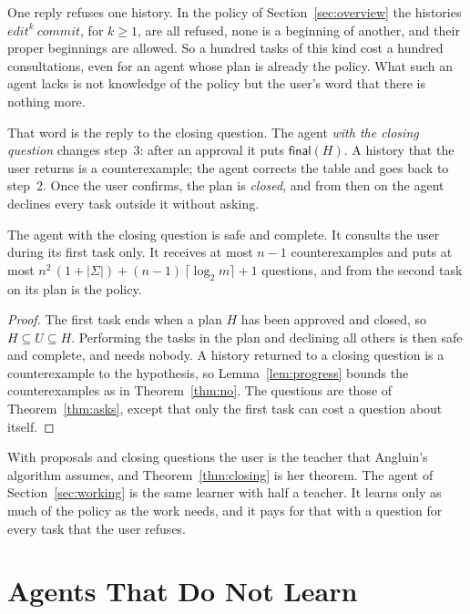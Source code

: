 \documentclass[acmsmall,nonacm,screen]{acmart}
\newcommand{\kw}[1]{\mathsf{#1}}
\newcommand{\nm}[1]{\mathit{#1}}
\newcommand{\final}[1]{\kw{final}(#1)}
\newcommand{\edit}{\nm{edit}}
\newcommand{\commit}{\nm{commit}}
\begin{document}
One reply refuses one history. In the policy of Section~\ref{sec:overview} the histories
$\edit^k\ \commit$, for $k \ge 1$, are all refused, none is a beginning of another, and
their proper beginnings are allowed. So a hundred tasks of this kind cost a hundred
consultations, even for an agent whose plan is already the policy. What such an agent
lacks is not knowledge of the policy but the user's word that there is nothing more.

That word is the reply to the closing question. The agent \emph{with the closing question}
changes step~3: after an approval it puts $\final{H}$. A history that the user returns is a
counterexample; the agent corrects the table and goes back to step~2. Once the user
confirms, the plan is \emph{closed}, and from then on the agent declines every task outside
it without asking.

\begin{theorem}
\label{thm:closing}
The agent with the closing question is safe and complete. It consults the user during its
first task only. It receives at most $n - 1$ counterexamples and puts at most
$n^2\,(1 + |\Sigma|) + (n - 1)\,\lceil \log_2 m \rceil + 1$ questions, and from the second
task on its plan is the policy.
\end{theorem}

\begin{proof}
The first task ends when a plan $H$ has been approved and closed, so $H \subseteq U
\subseteq H$. Performing the tasks in the plan and declining all others is then safe and
complete, and needs nobody. A history returned to a closing question is a counterexample to
the hypothesis, so Lemma~\ref{lem:progress} bounds the counterexamples as in
Theorem~\ref{thm:no}. The questions are those of Theorem~\ref{thm:asks}, except that only
the first task can cost a question about itself.
\end{proof}

With proposals and closing questions the user is the teacher that Angluin's algorithm
assumes, and Theorem~\ref{thm:closing} is her theorem. The agent of
Section~\ref{sec:working} is the same learner with half a teacher. It learns only as much of the policy as the work needs, and it pays for
that with a question for every task that the user refuses.

\section{Agents That Do Not Learn}
\label{sec:others}
\end{document}
